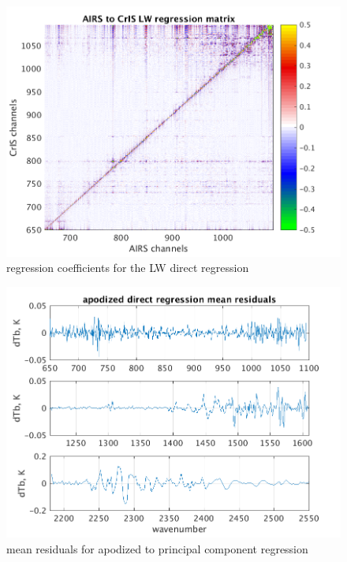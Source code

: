 \documentclass[10pt,twocolumn]{article}  %
\begin{document}
\begin{figure} %
  \centering
  \includegraphics[width=\linewidth]{slackfigs/full_7377_LW_regr_mat.png}
  \caption{regression coefficients for the LW direct regression}
  \label{dreg3}
\end{figure}

% 

\begin{figure} %
  \centering
  \includegraphics[width=\linewidth]{slackfigs/ap_pc_direct_regr.png}
  \caption{mean residuals for apodized {\airs} to {\cris} principal
    component regression}
  \label{dreg6}
\end{figure}
\end{document}
